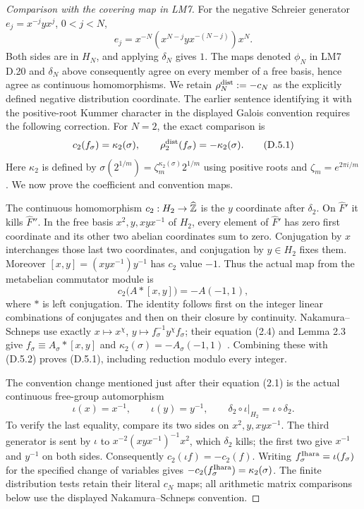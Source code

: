 \begin{proof}[Comparison with the covering map in LM7]
For the negative Schreier generator $e_j=x^{-j}yx^j$, $0<j<N$,
\[
 e_j=x^{-N}(x^{N-j}yx^{-(N-j)})x^N.
\]
Both sides are in $H_N$, and applying $\delta_N$ gives $1$.
The maps denoted $\phi_N$ in LM7 D.20 and $\delta_N$ above consequently
agree on every member of a free basis, hence agree as continuous
homomorphisms. We retain $\rho_N^{\rm dist}:=-c_N$ as
the explicitly defined negative distribution coordinate. The earlier
sentence identifying it with the positive-root Kummer character in
the displayed Galois convention requires the following correction.
For $N=2$, the exact comparison is
\[
 c_2(f_\sigma)=\kappa_2(\sigma),\qquad
 \rho_2^{\rm dist}(f_\sigma)=-\kappa_2(\sigma).
 \tag{D.5.1}
\]
Here $\kappa_2$ is defined by
$\sigma(2^{1/m})=\zeta_m^{\kappa_2(\sigma)}2^{1/m}$
using positive roots and $\zeta_m=e^{2\pi i/m}$.
We now prove the coefficient and convention maps.

The continuous homomorphism $c_2:H_2\to\widehat{\mathbb Z}$ is the
$y$ coordinate after $\delta_2$. On $\widehat F'$ it kills
$\widehat F''$. In the free basis
$x^2,y,xyx^{-1}$ of $H_2$, every element of $\widehat F'$
has zero first coordinate and its other two abelian coordinates
sum to zero. Conjugation by $x$ interchanges those last two
coordinates, and conjugation by $y\in H_2$ fixes them.
Moreover $[x,y]=(xyx^{-1})y^{-1}$ has $c_2$ value $-1$.
Thus the actual map from the metabelian commutator module is
\[
 c_2\bigl(A\ast[x,y]\bigr)=-A(-1,1),
 \tag{D.5.2}
\]
where $\ast$ is left conjugation. The identity follows first on
the integer linear combinations of conjugates and then on their
closure by continuity. Nakamura--Schneps use exactly
$x\mapsto x^\chi$, $y\mapsto f_\sigma^{-1}y^\chi f_\sigma$;
their equation (2.4) and Lemma 2.3 give
$f_\sigma\equiv A_\sigma\ast[x,y]$ and
$\kappa_2(\sigma)=-A_\sigma(-1,1)$
\cite[\S2, (2.1), (2.4), Lemma 2.3]{BCNakamuraSchneps2000}.
Combining these with \textup{(D.5.2)} proves
\textup{(D.5.1)}, including reduction modulo every integer.

The convention change mentioned just after their equation (2.1)
is the actual continuous free-group automorphism
\[
 \iota(x)=x^{-1},\qquad\iota(y)=y^{-1},\qquad
 \delta_2\circ\iota|_{H_2}=\iota\circ\delta_2.
 \tag{D.5.3}
\]
To verify the last equality, compare its two sides on
$x^2,y,xyx^{-1}$. The third generator is sent by $\iota$ to
$x^{-2}(xyx^{-1})^{-1}x^2$, which $\delta_2$ kills;
the first two give $x^{-1}$ and $y^{-1}$ on both sides.
Consequently $c_2(\iota f)=-c_2(f)$.
Writing $f_\sigma^{\rm Ihara}=\iota(f_\sigma)$ for the
specified change of variables gives
$-c_2(f_\sigma^{\rm Ihara})=\kappa_2(\sigma)$.
The finite distribution tests retain their literal $c_N$ maps;
all arithmetic matrix comparisons below use the displayed
Nakamura--Schneps convention.


\end{proof}
